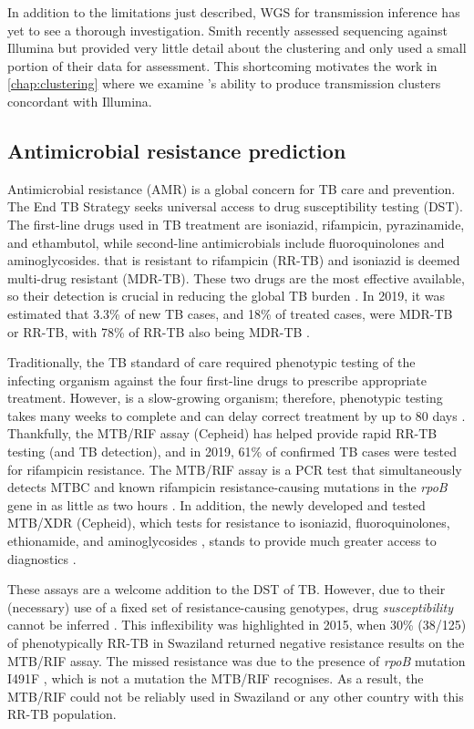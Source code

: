 In addition to the limitations just described, \ont{} WGS for transmission inference has yet to see a thorough investigation. Smith \etal{} recently assessed \ont{} sequencing against Illumina but provided very little detail about the clustering and only used a small portion of their data for assessment. This shortcoming motivates the work in \autoref{chap:clustering} where we examine \ont{}'s ability to produce transmission clusters concordant with Illumina.

\subsection{Antimicrobial resistance prediction}

Antimicrobial resistance (AMR) is a global concern for TB care and prevention. The End TB Strategy seeks universal access to drug susceptibility testing (DST). The first-line drugs used in TB treatment are isoniazid, rifampicin, pyrazinamide, and ethambutol, while second-line antimicrobials include fluoroquinolones and aminoglycosides. \mtb{} that is resistant to rifampicin (RR-TB) and isoniazid is deemed multi-drug resistant (MDR-TB). These two drugs are the most effective available, so their detection is crucial in reducing the global TB burden \cite{who2020}. In 2019, it was estimated that 3.3\% of new TB cases, and 18\% of treated cases, were MDR-TB or RR-TB, with 78\% of RR-TB also being MDR-TB \cite{who2020}.

Traditionally, the TB standard of care required phenotypic testing of the infecting organism against the four first-line drugs to prescribe appropriate treatment. However, \mtb{} is a slow-growing organism; therefore, phenotypic testing takes many weeks to complete and can delay correct treatment by up to 80 days \cite{Pankhurst2016}. Thankfully, the \xpert{} MTB/RIF assay (Cepheid) has helped provide rapid RR-TB testing (and TB detection), and in 2019, 61\% of confirmed TB cases were tested for rifampicin resistance. The \xpert{} MTB/RIF assay is a PCR test that simultaneously detects MTBC and known rifampicin resistance-causing mutations in the \textit{rpoB} gene in as little as two hours \cite{Boehme2011}. In addition, the newly developed and tested \xpert{} MTB/XDR (Cepheid), which tests for resistance to isoniazid, fluoroquinolones, ethionamide, and aminoglycosides \cite{Cao2021}, stands to provide much greater access to diagnostics \cite{Bainomugisa2020}.

These \xpert{} assays are a welcome addition to the DST of TB. However, due to their (necessary) use of a fixed set of resistance-causing genotypes, drug \emph{susceptibility} cannot be inferred \cite{Sanchez2015}. This inflexibility was highlighted in 2015, when 30\% (38/125) of phenotypically RR-TB in Swaziland returned negative resistance results on the \xpert{} MTB/RIF assay. The missed resistance was due to the presence of \textit{rpoB} mutation I491F \cite{Sanchez2015}, which is not a mutation the \xpert{} MTB/RIF recognises. As a result, the \xpert{} MTB/RIF could not be reliably used in Swaziland or any other country with this RR-TB population.

